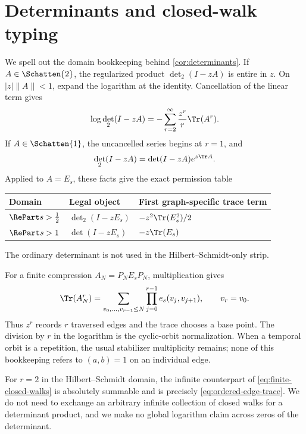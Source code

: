 \section{Determinants and closed-walk typing}
\label{app:determinants}

We spell out the domain bookkeeping behind
\cref{cor:determinants}.  If $A\in\Schatten{2}$, the regularized product
$\det_2(I-zA)$ is entire in $z$.  On $|z|\|A\|<1$, expand the logarithm at
the identity.  Cancellation of the linear term gives
\[
 \log\det_2(I-zA)
 =-\sum_{r=2}^{\infty}\frac{z^r}{r}\Tr(A^r).
\]
If $A\in\Schatten{1}$, the uncancelled series begins at $r=1$, and
\[
 \det_2(I-zA)=\det(I-zA)e^{z\Tr A}.
\]
Applied to $A=E_s$, these facts give the exact permission table
\begin{center}
\begin{tabular}{lll}
\toprule
Domain & Legal object & First graph-specific trace term\\
\midrule
$\RePart s>\tfrac12$ & $\det_2(I-zE_s)$
  & $-z^2\Tr(E_s^2)/2$\\
$\RePart s>1$ & $\det(I-zE_s)$
  & $-z\Tr(E_s)$\\
\bottomrule
\end{tabular}
\end{center}
The ordinary determinant is not used in the Hilbert--Schmidt-only strip.

For a finite compression $A_N=P_NE_sP_N$, multiplication gives
\begin{equation}
 \Tr(A_N^r)
 =\sum_{v_0,\ldots,v_{r-1}\leq N}
   \prod_{j=0}^{r-1}e_s(v_j,v_{j+1}),
 \qquad v_r=v_0.
 \label{eq:finite-closed-walks}
\end{equation}
Thus $z^r$ records $r$ traversed edges and the trace chooses a base point.
The division by $r$ in the logarithm is the cyclic-orbit normalization.
When a temporal orbit is a repetition, the usual stabilizer multiplicity
remains; none of this bookkeeping refers to $(a,b)=1$ on an individual
edge.

For $r=2$ in the Hilbert--Schmidt domain, the infinite counterpart of
\eqref{eq:finite-closed-walks} is absolutely summable and is precisely
\eqref{eq:ordered-edge-trace}.  We do not need to exchange an arbitrary
infinite collection of closed walks for a determinant product, and we make
no global logarithm claim across zeros of the determinant.

